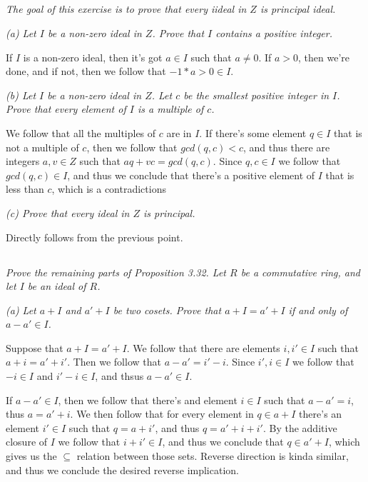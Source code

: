 \documentclass[11pt,oneside,titlepage]{book}
\begin{document}
\subsection{}

\textit{The goal of this exercise is to prove that every iideal in $Z$
is principal ideal.}

\textit{(a) Let $I$ be a non-zero ideal in $Z$. Prove that $I$
contains a positive integer.}

If $I$ is a non-zero ideal, then it's got $a \in I$ such that $a \neq
0$. If $a > 0$, then we're done, and if not, then we follow that $-1 *
a > 0 \in I$.

\textit{(b) Let $I$ be a non-zero ideal in $Z$. Let $c$ be the
smallest positive integer in $I$. Prove that every element of $I$ is a
multiple of $c$.}

We follow that all the multiples of $c$ are in $I$. If there's some
element $q \in I$ that is not a multiple of $c$, then we follow that
$gcd(q, c) < c$, and thus there are integers $a, v \in Z$ such that
$aq + vc = gcd(q, c)$. Since $q, c \in I$ we follow that $gcd(q, c)
\in I$, and thus we conclude that there's a positive element of $I$
that is less than $c$, which is a contradictions

\textit{(c) Prove that every ideal in $Z$ is principal.}

Directly follows from the previous point.

\subsection{}

\textit{Prove the remaining parts of Proposition 3.32. Let $R$ be a
commutative ring, and let $I$ be an ideal of $R$.}

\textit{(a) Let $a + I$ and $a' + I$ be two cosets. Prove that $a + I
= a' + I$ if and only of $a - a' \in I$.}

Suppose that $a + I = a' + I$. We follow that there are elements $i,
i' \in I$ such that $a + i = a' + i'$. Then we follow that $a - a' =
i' - i$. Since $i', i \in I$ we follow that $-i \in I$ and $i' - i \in
I$, and thsus $a - a' \in I$.

If $a - a' \in I$, then we follow that there's and element $i \in I$
such that $a - a' = i$, thus $a = a' + i$. We then follow that for
every element in $q \in a + I$ there's an element $i' \in I$ such that
$q = a + i'$, and thus $q = a' + i + i'$. By the additive closure of
$I$ we follow that $i + i' \in I$, and thus we conclude that $q \in a'
+ I$, which gives us the $\subseteq$ relation between those
sets. Reverse direction is kinda similar, and thus we conclude the
desired reverse implication.
\end{document}
